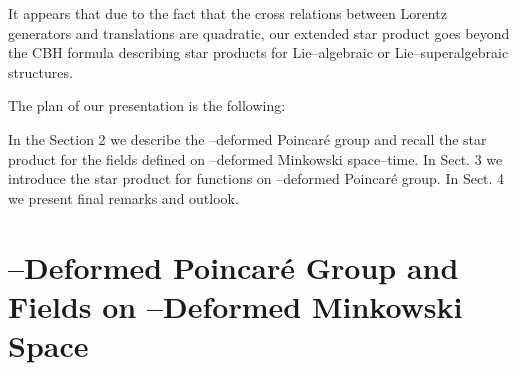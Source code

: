 \documentclass[a4paper,12pt]{article}
\begin{document}
  It  appears that  due to the fact that the cross relations  between  
Lorentz
  generators \myHighlight{$\widehat{\Lambda}_{\mu\nu}$}\coordHE{} and translations
  \coordHE{} are quadratic, our  extended star product
  goes beyond the CBH formula describing star products for
  Lie--algebraic or Lie--superalgebraic structures.

  The plan of our presentation is the following:

  In the Section 2 we describe the \myHighlight{$ \kappa$}\coordHE{}--deformed
  Poincar\'{e}  group and recall the star product for the fields
  defined on \myHighlight{$\kappa$}\coordHE{}--deformed Minkowski space--time. In Sect. 3
  we introduce the  star product for functions on
  \myHighlight{$\kappa$}\coordHE{}--deformed Poincar\'{e} group. In Sect. 4 we present
  final remarks and outlook.


\section{\myHighlight{$\kappa$}\coordHE{}--Deformed Poincar\'{e} Group and Fields on
\myHighlight{$\kappa$}\coordHE{}--Deformed Minkowski Space}
\end{document}
